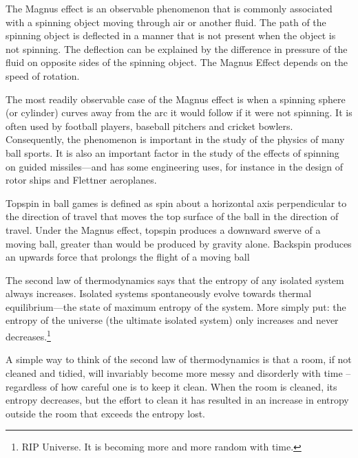 \begin{phybox}{}
    {The Magnus effect is an observable phenomenon that is commonly associated with a spinning object moving through air or another fluid. The path of the spinning object is deflected in a manner that is not present when the object is not spinning. The deflection can be explained by the difference in pressure of the fluid on opposite sides of the spinning object. The Magnus Effect depends on the speed of rotation.

    The most readily observable case of the Magnus effect is when a spinning sphere (or cylinder) curves away from the arc it would follow if it were not spinning. It is often used by football players, baseball pitchers and cricket bowlers. Consequently, the phenomenon is important in the study of the physics of many ball sports. It is also an important factor in the study of the effects of spinning on guided missiles—and has some engineering uses, for instance in the design of rotor ships and Flettner aeroplanes.
    
    Topspin in ball games is defined as spin about a horizontal axis perpendicular to the direction of travel that moves the top surface of the ball in the direction of travel. Under the Magnus effect, topspin produces a downward swerve of a moving ball, greater than would be produced by gravity alone. Backspin produces an upwards force that prolongs the flight of a moving ball}
\end{phybox}
\begin{chembox}{}
    {The second law of thermodynamics says that the entropy of any isolated system always increases. Isolated systems spontaneously evolve towards thermal equilibrium—the state of maximum entropy of the system. More simply put: the entropy of the universe (the ultimate isolated system) only increases and never decreases.\footnote{RIP Universe. It is becoming more and more random with time.}

    A simple way to think of the second law of thermodynamics is that a room, if not cleaned and tidied, will invariably become more messy and disorderly with time – regardless of how careful one is to keep it clean. When the room is cleaned, its entropy decreases, but the effort to clean it has resulted in an increase in entropy outside the room that exceeds the entropy lost.}
\end{chembox}
